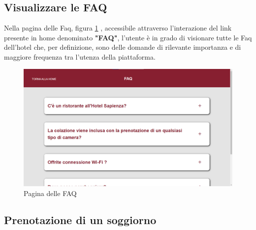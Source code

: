 \documentclass [a4paper, 12pt]{book}
\begin{document}
\medskip

\subsection{Visualizzare le FAQ}
Nella pagina delle Faq, figura \ref{FaqVisitatore} , accessibile attraverso l'interazione del link presente in home denominato \textbf{"FAQ"}, l'utente è in grado di visionare tutte le Faq dell'hotel che, per definizione, sono delle domande di rilevante importanza e di maggiore frequenza tra l'utenza della piattaforma.
\begin{figure}[!ht]
\centering
\includegraphics[scale=0.29]{FaqVisitatore.png}
\caption{Pagina delle FAQ}
\label{FaqVisitatore}
\end{figure}

\subsection{Prenotazione di un soggiorno}
\end{document}
